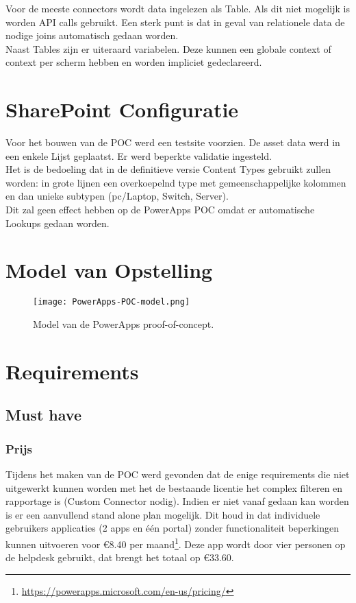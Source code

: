Voor de meeste connectors wordt data ingelezen als Table. Als dit niet mogelijk is worden API calls gebruikt. Een sterk punt is dat in geval van relationele data de nodige joins automatisch gedaan worden. \autocite{Lindhorst2018}\\
Naast Tables zijn er uiteraard variabelen. Deze kunnen een globale context of context per scherm hebben en worden impliciet gedeclareerd.

\section{SharePoint Configuratie}
\label{sec:sharepoint}


Voor het bouwen van de POC werd een testsite voorzien. De asset data werd in een enkele Lijst geplaatst. Er werd beperkte validatie ingesteld.\\
Het is de bedoeling dat in de definitieve versie Content Types gebruikt zullen worden: in grote lijnen een overkoepelnd type met gemeenschappelijke kolommen en dan unieke subtypen (pc/Laptop, Switch, Server). \\
Dit zal geen effect hebben op de PowerApps POC omdat er automatische Lookups gedaan worden.

\section{Model van Opstelling}

\begin{figure}[h!]
    \centering
    \texttt{[image: PowerApps-POC-model.png]}
    \caption{Model van de PowerApps proof-of-concept.}
    \label{fig:PowerApps-POC-model}
\end{figure}

\section{Requirements}

\subsection{Must have}

\subsubsection{Prijs}

Tijdens het maken van de POC werd gevonden dat de enige requirements die niet uitgewerkt kunnen worden met het de bestaande licentie het complex filteren en rapportage is (Custom Connector nodig). Indien er niet vanaf gedaan kan worden is er een aanvullend stand alone plan mogelijk. Dit houd in dat individuele gebruikers applicaties (2 apps en één portal) zonder functionaliteit beperkingen kunnen uitvoeren voor \euro 8.40 per maand\footnote{\url{https://powerapps.microsoft.com/en-us/pricing/}}. Deze app wordt door vier personen op de helpdesk gebruikt, dat brengt het totaal op \euro 33.60.

